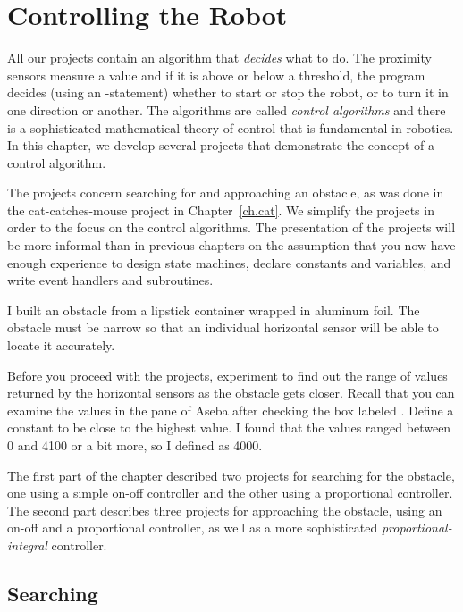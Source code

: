 
\chapter{Controlling the Robot}\label{ch.control}

All our projects contain an algorithm that \emph{decides} what to do.
The proximity sensors measure a value and if it is above or below a
threshold, the program decides (using an -statement) whether to
start or stop the robot, or to turn it in one direction or another. The
algorithms are called \emph{control algorithms} and there is a
sophisticated mathematical theory of control that is fundamental in
robotics. In this chapter, we develop several projects that demonstrate
the concept of a control algorithm.

The projects concern searching for and approaching an obstacle, as was
done in the cat-catches-mouse project in Chapter~\ref{ch.cat}. We
simplify the projects in order to the focus on the control algorithms.
The presentation of the projects will be more informal than in
previous chapters on the assumption that you now have enough experience
to design state machines, declare constants and variables, and write
event handlers and subroutines.

I built an obstacle from a lipstick container wrapped in aluminum foil.
The obstacle must be narrow so that an individual horizontal sensor
will be able to locate it accurately.


Before you proceed with the projects, experiment to find out the range
of values returned by the horizontal sensors as the obstacle
gets closer. Recall that you can examine the values in the
 pane of Aseba after checking the box labeled .
Define a constant  to be close to the highest value. I
found that the values ranged between 0 and 4100 or a bit more, so I
defined  as 4000.

The first part of the chapter described two projects for searching for
the obstacle, one using a simple on-off controller and the other using a
proportional controller. The second part describes three projects for
approaching the obstacle, using an on-off and a proportional controller,
as well as a more sophisticated \emph{proportional-integral} controller.

\section{Searching}

